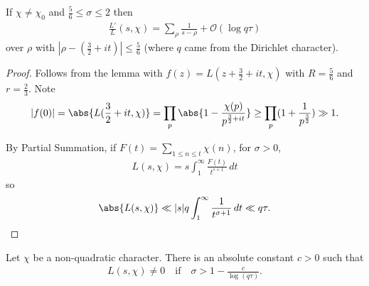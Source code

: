 \documentclass{article}
\newcommand{\1}{\mathbbm{1}}
\newcommand{\bigO}{\mathcal{O}}
\begin{document}
\begin{nlemma}\label{lem:1}
  If $\chi \neq \chi_0$ and $\frac{5}{6} \leq \sigma \leq 2$ then
  \begin{align*}
    \frac{L'}{L}(s,\chi) = \sum_\rho \frac{1}{s-\rho} + \bigO(\log q \tau)
  \end{align*}
  over $\rho$ with $|\rho - (\frac{3}{2}+it)| \leq \frac 56$
  (where $q$ came from the Dirichlet character).
\end{nlemma}
\begin{proof}
  Follows from the lemma with $f(z) = L(z + \frac{3}{2} + it, \chi)$ with $R = \frac{5}{6}$ and $r = \frac{2}{3}$.
  Note
  \begin{align*}
    |f(0)| = \abs{L(\frac{3}{2} +it,\chi)} = \prod_p \abs{1 - \frac{\chi(p)}{p^{\frac 32 + it}}} \geq \prod_p (1 + \frac{1}{p^{\frac 32}}) \gg 1.
  \end{align*}

  By Partial Summation, if $F(t) = \sum_{1 \leq n \leq t} \chi(n)$, for $\sigma > 0$,
  \begin{align*}
    L(s,\chi) = s \int_1^\infty \frac{F(t)}{t^{s+1}}\,dt
  \end{align*}
  so
  \begin{equation*}
    \abs{L(s,\chi)} \ll |s| q \int_1^\infty \frac{1}{t^{\sigma+1}}\,dt \ll q\tau.\qedhere
  \end{equation*}
\end{proof}
\begin{thm}
  Let $\chi$ be a non-quadratic character.
  There is an absolute constant $c > 0$ such that
  \begin{align*}
    L(s,\chi) \neq 0 \quad \text{if} \quad \sigma > 1 - \frac{c}{\log(q \tau)}.
  \end{align*}
\end{thm}
\end{document}
